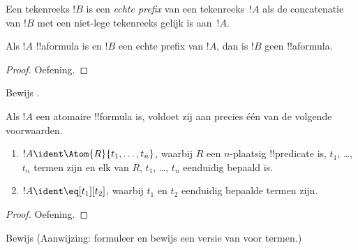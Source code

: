 \documentclass[../../../include/open-logic-section]{subfiles}
\begin{document}
\begin{defn}
Een tekenreeks $!B$ is een \emph{echte prefix} van een tekenreeks~$!A$
als de concatenatie van $!B$ met een niet-lege tekenreeks gelijk is
aan~$!A$.
\end{defn}

\begin{lem}
Als $!A$ !!a{formula} is en $!B$ een echte prefix van $!A$, dan is
$!B$ geen !!a{formula}.
\end{lem}

\begin{proof}
Oefening.
\end{proof}

\begin{prob}
Bewijs .
\end{prob}

\begin{prop}
Als $!A$ een atomaire !!{formula} is, voldoet zij aan precies één van
de volgende voorwaarden.
\begin{enumerate}
\item $!A \ident \Atom{R}{t_1,\dots,t_n}$, waarbij $R$ een $n$-plaatsig
  !!{predicate} is, $t_1$, \dots, $t_n$ termen zijn en elk van $R$,
  $t_1$, \dots, $t_n$ eenduidig bepaald is.
\item $!A \ident \eq[t_1][t_2]$, waarbij $t_1$ en $t_2$ eenduidig
  bepaalde termen zijn.
\end{enumerate}
\end{prop}

\begin{proof}
Oefening.
\end{proof}

\begin{prob}
Bewijs  (Aanwijzing: formuleer
en bewijs een versie van  voor termen.)
\end{prob}
\end{document}
